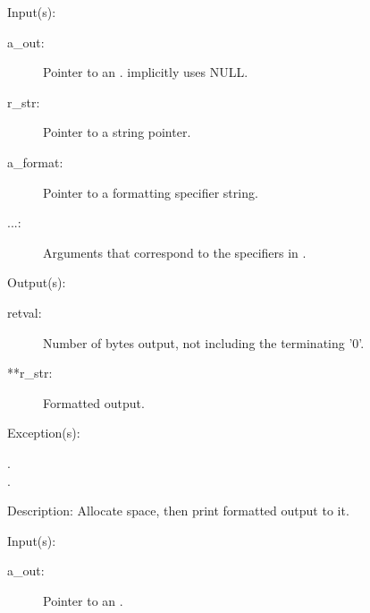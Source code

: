 \begin{capi}
	\begin{capilist}
	\item[Input(s): ]
		\begin{description}\item[]
		\item[a\_out: ]
			Pointer to an .
			 implicitly uses NULL.
		\item[r\_str: ]
			Pointer to a string pointer.
		\item[a\_format: ]
			Pointer to a formatting specifier string.
		\item[...: ]
			Arguments that correspond to the specifiers in
			.
		\end{description}
	\item[Output(s): ]
		\begin{description}\item[]
		\item[retval: ]
			Number of bytes output, not including the terminating
			'{\bs}0'.
		\item[**r\_str: ]
			Formatted output.
		\end{description}
	\item[Exception(s): ]
		\begin{description}\item[]
		\item[.]
		\item[.]
		\end{description}
	\item[Description: ]
		Allocate space, then print formatted output to it.
	\end{capilist}
\label{out_put_sn}
\label{_cw_out_put_sn}
	\begin{capilist}
	\item[Input(s): ]
		\begin{description}\item[]
		\item[a\_out: ]
			Pointer to an \classname{out}.

\end{description}
\end{capilist}
\end{capi}
